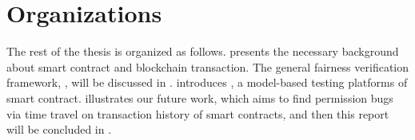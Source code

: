 \section{Organizations}
The rest of the thesis is organized as follows.
 presents the necessary background about smart contract and blockchain transaction.
The general fairness verification framework, \faircon, will be discussed in .
 introduces \modcon, a model-based testing platforms of smart contract.
 illustrates our future work, which aims to find permission bugs via time travel on transaction history of smart contracts,
and then this report will be concluded in .


